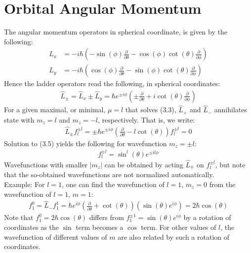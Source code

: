 \documentclass[11pt]{book}
\theoremstyle{break}
\theoremstyle{break}
\newcommand{\pd}{\partial}
\newcommand{\example}{\color{green}Example: \color{black}}
\begin{document}
\section[Orbital Angular Momentum]{\color{red}Orbital Angular Momentum\color{black}}
The angular momentum operators in spherical coordinate, is given by the following:
\begin{align*}
\hat{L}_x &= -i\hbar \left( -\sin(\phi) \frac{\pd}{\pd \theta} - \cos(\phi) \cot(\theta) \frac{\pd}{\pd \phi}\right)\\
\hat{L}_y &= -i\hbar \left( \cos(\phi) \frac{\pd}{\pd \theta} - \sin(\phi) \cot(\theta) \frac{\pd}{\pd \phi}\right)
\end{align*}
Hence the ladder operators read the following, in spherical coordinates:
\begin{align*}
\hat{L}_{\pm} = \hat{L}_x \pm \hat{L}_y = \hbar e^{\pm i\phi}\left( \pm \frac{\pd}{\pd \theta}+i \cot(\theta) \frac{\pd}{\pd \phi}\right)
\end{align*}
For a given maximal, or minimal, $\mu = l$ that solves (3.3), $\hat{L}_{+}$ and $\hat{L}_-$ annihilates state with $m_z = l$ and $m_z = -l$, respectively. That is, we write:
\begin{align}
\hat{L}_{\pm}f_l^{\pm l} = \pm \hbar e^{\pm i\phi}\left( \frac{\pd}{\pd \theta}- l\cot(\theta)\right) f_l^{\pm l} = 0 
\end{align}  
Solution to (3.5) yields the following for wavefunction $m_z = \pm l$:
\begin{align*}
f_l^{\pm l} = \sin^l (\theta) e^{\pm i l \phi}
\end{align*}
Wavefunctions with smaller $|m_z|$ can be obtained by acting $\hat{L}_{\mp}$ on $f_l^{\pm l}$, but note that the so-obtained wavefunctions are not normalized automatically.\\

\example For $l=1$, one can find the wavefunction of $l=1$, $m_z = 0$ from the wavefunction of $l=1$, $m=1$:
\begin{align*}
f_1^0  = \hat{L}_- f_1^1 = \hbar e^{i\phi}\left( \frac{\pd}{\pd \theta}+\cot(\theta) \right) (\sin(\theta) e^{i\phi}) = 2\hbar \cos(\theta)
\end{align*}
Note that $f_1^0 = 2\hbar \cos(\theta)$ differs from $f_1^{\pm 1} = \sin(\theta) e^{i\phi}$ by a rotation of coordinates as the $\sin$ term becomes a $\cos$ term. For other values of $l$, the wavefunction of different values of $m$ are also related by such a rotation of coordinates.\\
\end{document}
